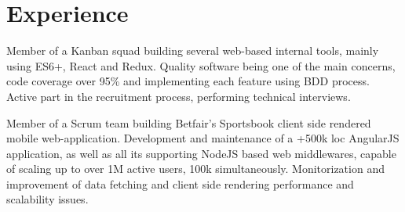 \documentclass[]{andre-vechina-resume}
\begin{document}
\lastupdated




\section{Experience}

\vspace{\topsep} %
\begin{tightemize}
\item Member of a Kanban squad building several web-based internal tools, mainly using ES6+, React and Redux. Quality software being one of the main concerns, code coverage over 95\% and implementing each feature using BDD process. Active part in the recruitment process, performing technical interviews.
\item Member of a Scrum team building Betfair's Sportsbook client side rendered mobile web-application. Development and maintenance of a +500k loc AngularJS application, as well as all its supporting NodeJS based web middlewares, capable of scaling up to over 1M active users, 100k simultaneously. Monitorization and improvement of data fetching and client side rendering performance and scalability issues.
\end{tightemize}
\vspace{\topsep} %
\sectionsep
\end{document}
